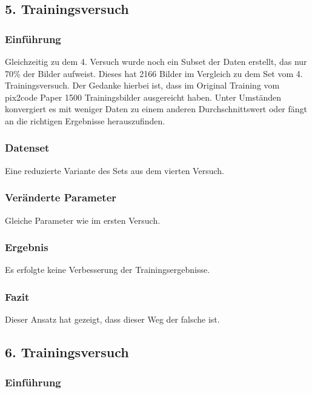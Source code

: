 \documentclass[pdftex,a4paper,halfparskip, article]{scrartcl}
\begin{document}
\subsection{5. Trainingsversuch}

\subsubsection*{Einführung}

Gleichzeitig zu dem 4. Versuch wurde noch ein Subset der Daten erstellt, das nur 70\% der Bilder aufweist. Dieses hat 2166 Bilder im Vergleich zu dem Set vom 4. Trainingsversuch. Der Gedanke hierbei ist, dass im Original Training vom pix2code Paper 1500 Trainingsbilder ausgereicht haben. Unter Umständen konvergiert es mit weniger Daten zu einem anderen Durchschnittswert oder fängt an die richtigen Ergebnisse herauszufinden.

\subsubsection*{Datenset}
Eine reduzierte Variante des Sets aus dem vierten Versuch.

\subsubsection*{Veränderte Parameter}

Gleiche Parameter wie im ersten Versuch.

\subsubsection*{Ergebnis}

Es erfolgte keine Verbesserung der Trainingsergebnisse.

\subsubsection*{Fazit}

Dieser Ansatz hat gezeigt, dass dieser Weg der falsche ist.

\subsection{6. Trainingsversuch}

\subsubsection*{Einführung}
\end{document}
